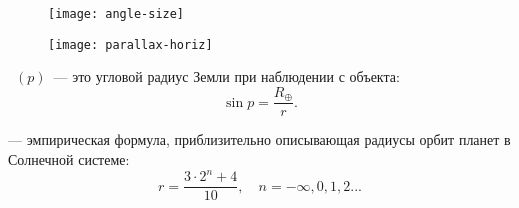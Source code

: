 \vspace{-1.5pc}
\begin{figure}[h!]
	\begin{minipage}[b]{0.5\tw}
		\begin{flushleft}
			\texttt{[image: angle-size]}
		\end{flushleft}
	\end{minipage}
	\begin{minipage}[b]{0.5\tw}
		\centering
		\texttt{[image: parallax-horiz]}
	\end{minipage}
\end{figure}

~$(p)$~--- это угловой радиус Земли при наблюдении с объекта:
\begin{equation}
	\sin p=\frac{R_\oplus}{r}.
\end{equation}

 --- эмпирическая формула, приблизительно описывающая
радиусы орбит планет в Солнечной системе:
\begin{equation}r=\frac{3\cdot 2^n+4}{10}, \quad n=-\infty, 0, 1, 2...
\end{equation}

